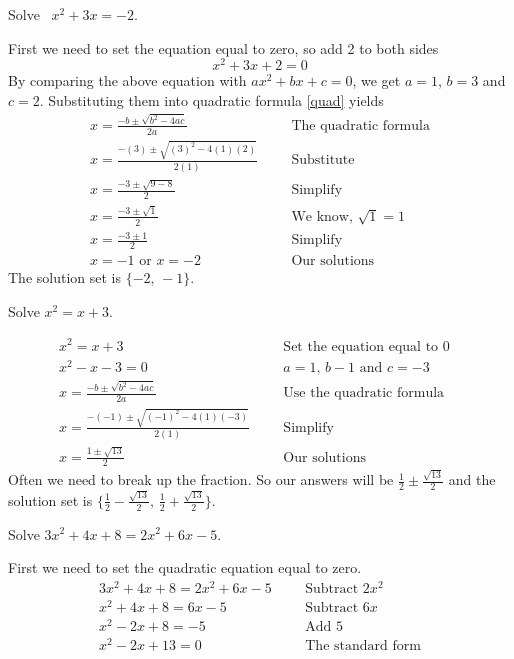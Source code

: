 \vspace{0.4cm}
\begin{exa}
	Solve \ $x^2+3x=-2$.
\end{exa}
First we need to set the equation equal to zero, so add 2 to both sides \[
			x^2+3x+2=0
\]
By comparing the above equation with $ax^2+bx+c=0$, we get $a=1$, $b=3$ and $c=2$. Substituting
them into quadratic formula \eqref{quad} yields
		\begin{align*}
			x =\frac{-b \pm \sqrt{b^2-4ac}}{2a}&   &&\text{The quadratic formula}\\
			x =\frac{-(3) \pm \sqrt{(3)^2-4(1)(2)}}{2(1)}&  &&\text{Substitute}\\
			x =\frac{-3 \pm \sqrt{9-8}}{2}& &&\text{Simplify}\\
	    	x =\frac{-3 \pm \sqrt{1}}{2}&&  &\text{We know, $\sqrt{1}=1$}\\
			x =\frac{-3 \pm 1}{2}&  &&\text{Simplify} \\
			x=-1\,\,\text{or}\,\,x=-2& &&\text{Our solutions}
		\end{align*}
The solution set is $\{-2,\,-1\}$.
\vspace{0.4cm}
\begin{exa}
    Solve $x^2=x+3$.
\end{exa}
\begin{align*}
    x^2=x+3&    &   &\text{Set the equation equal to $0$}\\
    x^2-x-3=0&    &   &\text{$a=1$, $b-1$ and $c=-3$}\\
    x =\frac{-b \pm \sqrt{b^2-4ac}}{2a}& &&\text{Use the quadratic formula}&\\
    x =\frac{-(-1) \pm \sqrt{(-1)^2-4(1)(-3)}}{2(1)}&  &&\text{Simplify}\\
    x =\frac{1 \pm \sqrt{13}}{2}&  &   &\text{Our solutions}
\end{align*}
Often we need to break up the fraction. So our answers will be
$\frac{1}{2} \pm \frac{\sqrt{13}}{2}$ and the solution set is
$\{\frac{1}{2} - \frac{\sqrt{13}}{2},\,\frac{1}{2}+ \frac{\sqrt{13}}{2}\}$.
\vspace{0.4cm}
\begin{exa}
    Solve $3x^2+4x+8=2x^2+6x-5$.
\end{exa}
First we need to set the quadratic equation equal to zero.
\begin{align*}
    3x^2+4x+8=2x^2+6x-5&        &   &\text{Subtract $2x^2$}\\
    x^2+4x+8=6x-5&              &   &\text{Subtract $6x$}\\
    x^2-2x+8=-5&                &   &\text{Add 5}\\
    x^2-2x+13=0&                &   &\text{The standard form}
\end{align*}
